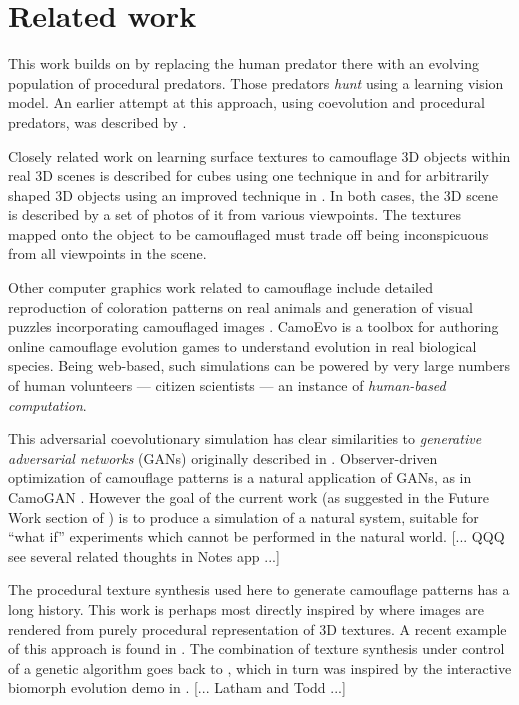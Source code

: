 \documentclass[acmtog]{acmart}
\newcommand{\jargon}[1]{\textit{#1}}
\begin{document}
\section{Related work}
This work builds on \citet{Reynolds2011} by replacing the human predator there with an evolving population of procedural predators. Those predators \jargon{hunt} using a learning vision model. An earlier attempt at this approach, using coevolution and procedural predators, was described by \citet{harrington_coevolution_2014}.
\par
Closely related work on learning surface textures to camouflage 3D objects within real 3D scenes is described for cubes using one technique in \citet{owens_camouflaging_2014} and for arbitrarily shaped 3D objects using an improved technique in \citet{guo_ganmouflage_2022}. In both cases, the 3D scene is described by a set of photos of it from various viewpoints. The textures mapped onto the object to be camouflaged must trade off being inconspicuous from all viewpoints in the scene.
\par
Other computer graphics work related to camouflage include detailed reproduction of coloration patterns on real animals \cite{de_gomensoro_malheiros_leopard_2020} and generation of visual puzzles incorporating camouflaged images \cite{chu_camo_image_2010} \cite{Zhang_Yin_Nie_Zheng_2020}. CamoEvo \cite{hancock_camoevo_2022} is a toolbox for authoring online camouflage evolution games to understand evolution in real biological species. Being web-based, such simulations can be powered by very large numbers of human volunteers — citizen scientists — an instance of \jargon{human-based computation}.
\par
This adversarial coevolutionary simulation has clear similarities to \jargon{generative adversarial networks} (GANs) originally described in \citet{goodfellow_gan_2014}. Observer-driven optimization of camouflage patterns is a natural application of GANs, as in CamoGAN \cite{talas_camogan_2020}. However the goal of the current work (as suggested in the Future Work section of \citet{Reynolds2011}) is to produce a simulation of a natural system, suitable for “what if” experiments which cannot be performed in the natural world. [... QQQ see several related thoughts in Notes app ...]
\par
The procedural texture synthesis used here to generate camouflage patterns has a long history. This work is perhaps most directly inspired by \citet{perlin_image_1985} where images are rendered from purely procedural representation of 3D textures. A recent example of this approach is found in \citet{Guerrero_MatFormer_2022}. The combination of texture synthesis under control of a genetic algorithm goes back to \citet{sims_artificial_1991}, which in turn was inspired by the interactive biomorph evolution demo in \citet{dawkins_blind_1986}. [... Latham and Todd ...]
\end{document}
